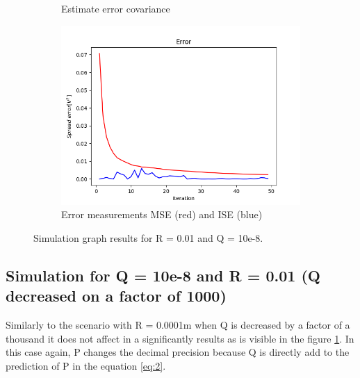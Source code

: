 \documentclass{article}
\begin{document}
\begin{figure}
\begin{subfigure} {.5\textwidth}
            \caption{Estimate error covariance}
        \end{subfigure}
        \begin{subfigure}{.5\textwidth}            
            \centering
            \includegraphics[width=0.8\linewidth]{./img/r01q-8_E.png}
            \caption{Error measurements MSE (red) and ISE (blue)}
        \end{subfigure}
        \caption{Simulation graph results for R = 0.01 and Q = 10e-8.}
        \label{fig:simulation4}
    \end{figure}   

    \subsection{Simulation for Q = 10e-8 and R = 0.01 (Q decreased on a factor of 1000)}
    
    Similarly to the scenario with R = 0.0001m when Q is decreased by a factor of a thousand it does not 
    affect in a significantly results as is visible in the figure \ref{fig:simulation4}. In this case
    again, P changes the decimal precision because Q is directly add to the prediction of P in the equation 
    \ref{eq:2}.
\end{document}
